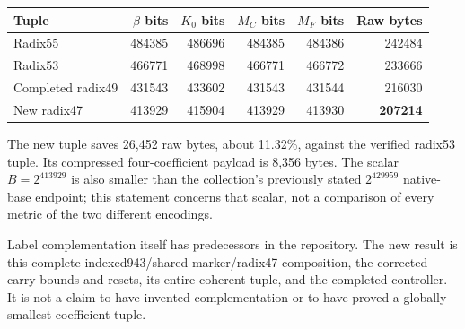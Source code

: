 \begin{center}
\begin{tabular}{@{}lrrrrr@{}}
\toprule
Tuple & $\beta$ bits & $K_0$ bits & $M_C$ bits & $M_F$ bits & Raw bytes\\
\midrule
Radix55 & 484385 & 486696 & 484385 & 484386 & 242484\\
Radix53 & 466771 & 468998 & 466771 & 466772 & 233666\\
Completed radix49 & 431543 & 433602 & 431543 & 431544 & 216030\\
New radix47 & 413929 & 415904 & 413929 & 413930 & \textbf{207214}\\
\bottomrule
\end{tabular}
\end{center}

The new tuple saves 26,452 raw bytes, about 11.32\%, against the verified
radix53 tuple. Its compressed four-coefficient payload is 8,356 bytes.
The scalar $B=2^{413929}$ is also smaller than the collection's previously
stated $2^{429959}$ native-base endpoint; this statement concerns that
scalar, not a comparison of every metric of the two different encodings.

Label complementation itself has predecessors in the repository. The new
result is this complete indexed943/shared-marker/radix47 composition,
the corrected carry bounds and resets, its entire coherent tuple, and the
completed controller. It is not a claim to have invented complementation
or to have proved a globally smallest coefficient tuple.
